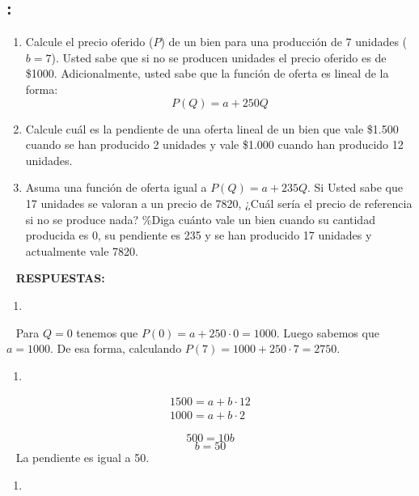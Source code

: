 \documentclass[
  letterpaper,
  DIV=11,
  numbers=noendperiod]{scrreport}
\providecommand{\tightlist}{%
  \setlength{\itemsep}{0pt}\setlength{\parskip}{0pt}}\usepackage{longtable,booktabs,array}
\begin{document}
\hypertarget{section-8}{%
\subsection{:}\label{section-8}}

\begin{enumerate}
\def\labelenumi{\alph{enumi})}
\item
  Calcule el precio oferido (\(P\)) de un bien para una producción de 7
  unidades (\(b=7\)). Usted sabe que si no se producen unidades el
  precio oferido es de \$1000. Adicionalmente, usted sabe que la función
  de oferta es lineal de la forma: \[P(Q)=a+250Q\]
\item
  Calcule cuál es la pendiente de una oferta lineal de un bien que vale
  \$1.500 cuando se han producido 2 unidades y vale \$1.000 cuando han
  producido 12 unidades.
\item
  Asuma una función de oferta igual a \(P(Q)=a+235Q\). Si Usted sabe que
  17 unidades se valoran a un precio de 7820, ¿Cuál sería el precio de
  referencia si no se produce nada? \%Diga cuánto vale un bien cuando su
  cantidad producida es 0, su pendiente es 235 y se han producido 17
  unidades y actualmente vale 7820.
\end{enumerate}

~ \textbf{RESPUESTAS:}

\begin{enumerate}
\def\labelenumi{\alph{enumi})}
\tightlist
\item
\end{enumerate}

~ Para \(Q=0\) tenemos que \(P(0)=a+250\cdot 0=1000\). Luego sabemos que
\(a=1000\). De esa forma, calculando \(P(7)=1000+250\cdot7=2750.\)

\begin{enumerate}
\def\labelenumi{\alph{enumi})}
\setcounter{enumi}{1}
\tightlist
\item
\end{enumerate}

\[\begin{matrix}
        1500 = a + b\cdot12  \\
        1000 = a + b\cdot2 
\end{matrix}\]

\[500 = 10b\] \[b=50\] ~ La pendiente es igual a 50.

\begin{enumerate}
\def\labelenumi{\alph{enumi})}
\setcounter{enumi}{2}
\tightlist
\item
\end{enumerate}
\end{document}
